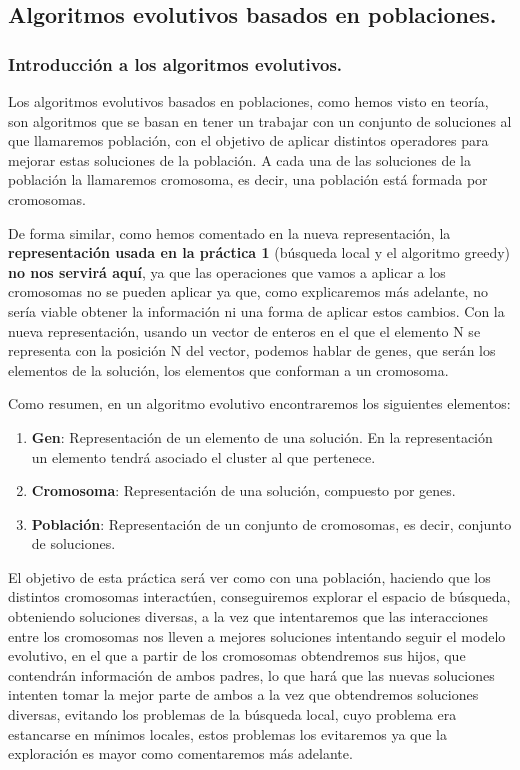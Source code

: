 \documentclass[12pt, spanish]{article}
\begin{document}
\newpage

\subsection{Algoritmos evolutivos basados en poblaciones.}

\subsubsection{Introducción a los algoritmos evolutivos.}

Los algoritmos evolutivos basados en poblaciones, como hemos visto en teoría, son algoritmos que se basan en tener un trabajar con un conjunto de soluciones al que llamaremos población, con el objetivo de aplicar distintos operadores para mejorar estas soluciones de la población. A cada una de las soluciones de la población la llamaremos cromosoma, es decir, una población está formada por cromosomas.

De forma similar, como hemos comentado en la nueva representación, la \textbf{representación usada en la práctica 1} (búsqueda local y el algoritmo greedy) \textbf{no nos servirá aquí}, ya que las operaciones que vamos a aplicar a los cromosomas no se pueden aplicar ya que, como explicaremos más adelante, no sería viable obtener la información ni una forma de aplicar estos cambios. Con la nueva representación, usando un vector de enteros en el que el elemento N se representa con la posición N del vector, podemos hablar de genes, que serán los elementos de la solución, los elementos que conforman a un cromosoma.

Como resumen, en un algoritmo evolutivo encontraremos los siguientes elementos:

\begin{enumerate}
	\item \textbf{Gen}: Representación de un elemento de una solución. En la representación un elemento tendrá asociado el cluster al que pertenece.
	\item \textbf{Cromosoma}: Representación de una solución, compuesto por genes.
	\item \textbf{Población}: Representación de un conjunto de cromosomas, es decir, conjunto de soluciones.
\end{enumerate}

El objetivo de esta práctica será ver como con una población, haciendo que los distintos cromosomas interactúen, conseguiremos explorar el espacio de búsqueda, obteniendo soluciones diversas, a la vez que intentaremos que las interacciones entre los cromosomas nos lleven a mejores soluciones intentando seguir el modelo evolutivo, en el que a partir de los cromosomas obtendremos sus hijos, que contendrán información de ambos padres, lo que hará que las nuevas soluciones intenten tomar la mejor parte de ambos a la vez que obtendremos soluciones diversas, evitando los problemas de la búsqueda local, cuyo problema era estancarse en mínimos locales, estos problemas los evitaremos ya que la exploración es mayor como comentaremos más adelante.
\end{document}
